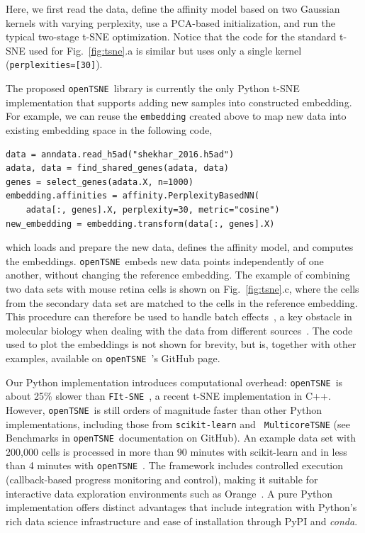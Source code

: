 \documentclass{bioinfo}
\newcommand{\opentsne}[0]{{\tt openTSNE}\ }
\begin{document}
\noindent Here, we first read the data, define the affinity model based on two
Gaussian kernels with varying perplexity, use a PCA-based initialization, and run
the typical two-stage t-SNE optimization. Notice that the code for the standard
t-SNE used for Fig.~\ref{fig:tsne}.a is similar but uses only a single kernel
({\tt perplexities=[30]}).

The proposed \opentsne library is currently the only Python t\nobreakdash -SNE
implementation that supports adding new samples into constructed embedding. For
example, we can reuse the {\tt embedding} created above to map new data into
existing embedding space in the following code,

\begin{lstlisting}
data = anndata.read_h5ad("shekhar_2016.h5ad")
adata, data = find_shared_genes(adata, data)
genes = select_genes(adata.X, n=1000)
embedding.affinities = affinity.PerplexityBasedNN(
	adata[:, genes].X, perplexity=30, metric="cosine")
new_embedding = embedding.transform(data[:, genes].X)
\end{lstlisting}

\noindent which loads and prepare the new data, defines the affinity model, and
computes the embeddings. \opentsne embeds new data points independently of one 
another, without changing the reference embedding. The example of combining two
data sets with mouse retina cells is shown on Fig.~\ref{fig:tsne}.c, where the
cells from the secondary data set are matched to the cells in the reference
embedding. This
procedure can therefore be used to handle batch effects~\citep{polivcar2019embedding}, a key
obstacle in molecular biology when dealing with the data from different
sources~\citep{batch_effect_causes}. The code used to plot the embeddings is not shown
for brevity, but is, together with other examples, available on {\opentsne}'s
GitHub page. 

Our Python implementation introduces computational overhead: \opentsne is about
25\% slower than {\tt FIt-SNE}~\citep{fi_tsne}, a recent t-SNE implementation
in C++. However, \opentsne is still orders of magnitude faster than other
Python implementations, including those from {\tt scikit-learn} and {\tt
MulticoreTSNE} (see Benchmarks in \opentsne documentation on GitHub). An example data set with 200,000 cells
is processed in more than 90 minutes with scikit-learn and in less than 4 minutes with \opentsne.
The framework includes controlled execution (callback-based progress monitoring and
control), making it suitable for interactive data exploration environments such
as Orange~\citep{scorange}. A pure Python implementation offers distinct
advantages that include integration with Python's rich data science
infrastructure and ease of installation through PyPI and {\em conda}.
\end{document}
